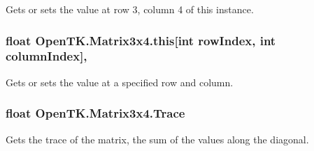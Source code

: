 Gets or sets the value at row 3, column 4 of this instance. 

\hypertarget{struct_open_t_k_1_1_matrix3x4_a7ad8c424b8df0cb99f11fc2b3ab0e879}{
\subsubsection[{this[int row\-Index, int column\-Index]}]{\setlength{\rightskip}{0pt plus 5cm}float Open\-T\-K.\-Matrix3x4.\-this\mbox{[}int row\-Index, int column\-Index\mbox{]}\hspace{0.3cm}{\ttfamily [get]}, {\ttfamily [set]}}}\label{struct_open_t_k_1_1_matrix3x4_a7ad8c424b8df0cb99f11fc2b3ab0e879}


Gets or sets the value at a specified row and column. 

\hypertarget{struct_open_t_k_1_1_matrix3x4_a46ec4abd1eaad2a7e6746595857f2fbb}{
\subsubsection[{Trace}]{\setlength{\rightskip}{0pt plus 5cm}float Open\-T\-K.\-Matrix3x4.\-Trace\hspace{0.3cm}{\ttfamily [get]}}}\label{struct_open_t_k_1_1_matrix3x4_a46ec4abd1eaad2a7e6746595857f2fbb}


Gets the trace of the matrix, the sum of the values along the diagonal. 

